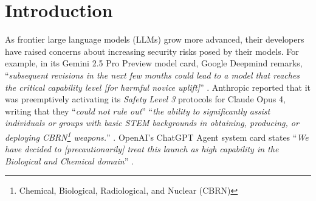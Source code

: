 




\newpage
\section{Introduction} \label{sec:intro}

As frontier large language models (LLMs) grow more advanced, their developers have raised concerns about increasing security risks posed by their models. 
For example, in its Gemini 2.5 Pro Preview model card, Google Deepmind remarks, ``\textit{subsequent revisions in the next few months could lead to a model that reaches the critical capability level [for harmful novice uplift]}'' \citep{google2025gemini2_5_pro_preview}.
Anthropic reported that it was preemptively activating its \textit{Safety Level 3} protocols for Claude Opus 4, writing that they ``\textit{could not rule out}'' ``\textit{the ability to significantly assist individuals or groups with basic STEM backgrounds in obtaining, producing, or deploying CBRN\footnote{Chemical, Biological, Radiological, and Nuclear (CBRN)} weapons.}'' \citep{anthropic_ASL3_2025}. 
OpenAI's ChatGPT Agent system card states ``\textit{We have decided to [precautionarily] treat this launch as high capability in the Biological and Chemical domain}'' \citep{OpenAI2025_ChatGPT_Agent}.

